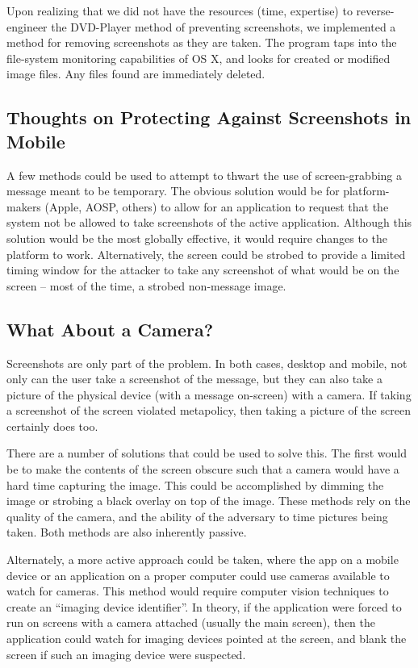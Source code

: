 \documentclass[11pt, a4paper,titlepage]{report}
\begin{document}
Upon realizing that we did not have the resources (time, expertise) to reverse-engineer the DVD-Player method of preventing screenshots, we implemented a method for removing screenshots as they are taken. The program taps into the file-system monitoring capabilities of OS X, and looks for created or modified image files. Any files found are immediately deleted.

\subsection*{Thoughts on Protecting Against Screenshots in Mobile} 
A few methods could be used to attempt to thwart the use of screen-grabbing a message meant to be temporary. The obvious solution would be for platform-makers (Apple, AOSP, others) to allow for an application to request that the system not be allowed to take screenshots of the active application. Although this solution would be the most globally effective, it would require changes to the platform to work. Alternatively, the screen could be strobed to provide a limited timing window for the attacker to take any screenshot of what would be on the screen -- most of the time, a strobed non-message image.

\subsection*{What About a Camera?}

Screenshots are only part of the problem. In both cases, desktop and mobile, not only can the user take a screenshot of the message, but they can also take a picture of the physical device (with a message on-screen) with a camera. If taking a screenshot of the screen violated metapolicy, then taking a picture of the screen certainly does too. 

There are a number of solutions that could be used to solve this. The first would be to make the contents of the screen obscure such that a camera would have a hard time capturing the image. This could be accomplished by dimming the image or strobing a black overlay on top of the image. These methods rely on the quality of the camera, and the ability of the adversary to time pictures being taken. Both methods are also inherently passive.

Alternately, a more active approach could be taken, where the app on a mobile device or an application on a proper computer could use cameras available to watch for cameras. This method would require computer vision techniques to create an ``imaging device identifier''. In theory, if the application were forced to run on screens with a camera attached (usually the main screen), then the application could watch for imaging devices pointed at the screen, and blank the screen if such an imaging device were suspected. 
\end{document}

